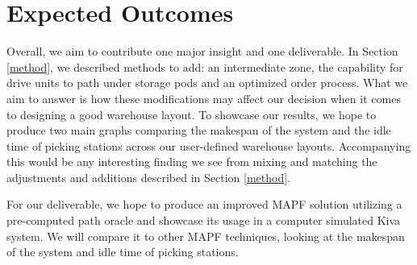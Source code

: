 \documentclass[a4paper,11pt]{article}
\begin{document}
\section{Expected Outcomes}
Overall, we aim to contribute one major insight and one deliverable. In Section \ref{method}, we described methods to add: an intermediate zone, the capability for drive units to path under storage pods and an optimized order process. What we aim to answer is how these modifications may affect our decision when it comes to designing a good warehouse layout. To showcase our results, we hope to produce two main graphs comparing the makespan of the system and the idle time of picking stations across our user-defined warehouse layouts. Accompanying this would be any interesting finding we see from mixing and matching the adjustments and additions described in Section \ref{method}. 

For our deliverable, we hope to produce an improved MAPF solution utilizing a pre-computed path oracle and showcase its usage in a computer simulated Kiva system. We will compare it to other MAPF techniques, looking at the makespan of the system and idle time of picking stations.



\end{document}
